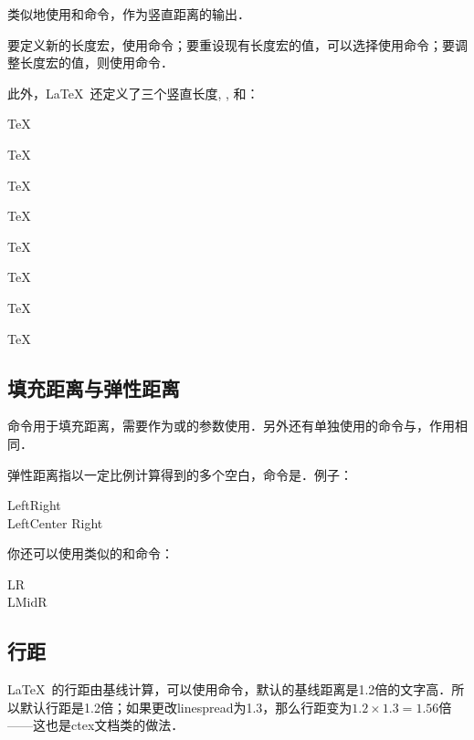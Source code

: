 类似地使用和命令，作为竖直距离的输出．

要定义新的长度宏，使用命令；要重设现有长度宏的值，可以选择使用命令；要调整长度宏的值，则使用命令．
\begin{latex}
\newlength{\mylatexlength}
\setlength{\mylatexlength}{10pt}
\addtolength{\mylatexlength}{-5pt}
\end{latex}

此外，\LaTeX\ 还定义了三个竖直长度, , 和：

\begin{codeshow}
\parbox[t]{3em}{TeX\par TeX}
\parbox[t]{3em}{TeX\par\smallskip TeX}
\parbox[t]{3em}{TeX\par\medskip TeX}
\parbox[t]{3em}{TeX\par\bigskip TeX}
\end{codeshow}

\subsection{填充距离与弹性距离}
命令用于填充距离，需要作为或的参数使用．另外还有单独使用的命令与，作用相同．

弹性距离指以一定比例计算得到的多个空白，命令是．例子：

\begin{codeshow}
Left\hspace{\fill}Right\\
LeftCenter
Right
\end{codeshow}

你还可以使用类似的和命令：

\begin{codeshow}
L\hfill R\\
L\hrulefill Mid\dotfill R
\end{codeshow}

\subsection{行距}
\LaTeX\ 的行距由基线计算，可以使用命令，默认的基线距离是1.2倍的文字高．所以默认行距是1.2倍；如果更改linespread为1.3，那么行距变为$1.2\times 1.3=1.56$倍——这也是ctex文档类的做法．

